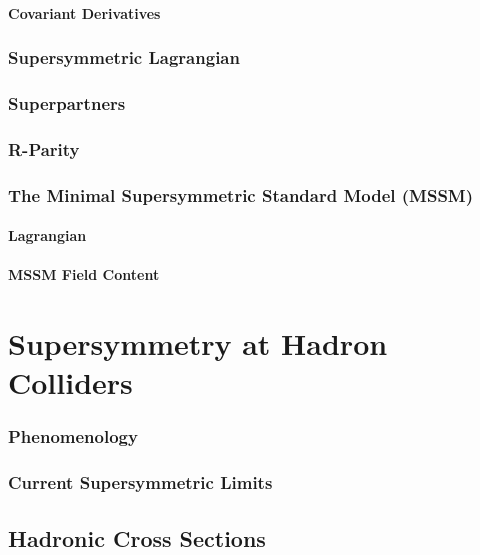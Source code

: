 \documentclass[twoside,english]{uiofysmaster}
\begin{document}
\subsubsection{Covariant Derivatives}

\subsection{Supersymmetric Lagrangian}

\subsection{Superpartners}

\subsection{R-Parity}

\subsection{The Minimal Supersymmetric Standard Model (MSSM)}

\subsubsection{Lagrangian}

\subsubsection{MSSM Field Content}




\chapter{Supersymmetry at Hadron Colliders}


\subsection{Phenomenology}

\subsection{Current Supersymmetric Limits}

\section{Hadronic Cross Sections}
\end{document}
